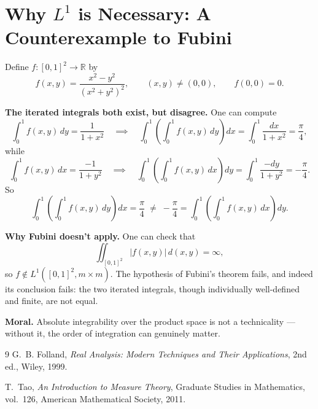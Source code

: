 \documentclass[11pt]{article}
\theoremstyle{definition}
\theoremstyle{plain}
\newcommand{\R}{\mathbb{R}}
\begin{document}
\section{Why \texorpdfstring{$L^{1}$}{L1} is Necessary: A Counterexample to Fubini}

Define $f : [0,1]^{2} \to \R$ by
\[
  f(x,y) = \frac{x^{2} - y^{2}}{(x^{2} + y^{2})^{2}},
  \qquad (x,y) \ne (0,0), \qquad f(0,0) = 0.
\]

\noindent
\textbf{The iterated integrals both exist, but disagree.} One can
compute
\[
  \int_0^1 f(x,y) \,dy = \frac{1}{1+x^{2}}
  \quad \implies \quad
  \int_0^1 \left( \int_0^1 f(x,y) \,dy \right) dx
    = \int_0^1 \frac{dx}{1+x^{2}} = \frac{\pi}{4},
\]
while
\[
  \int_0^1 f(x,y) \,dx = \frac{-1}{1+y^{2}}
  \quad \implies \quad
  \int_0^1 \left( \int_0^1 f(x,y) \,dx \right) dy
    = \int_0^1 \frac{-dy}{1+y^{2}} = -\frac{\pi}{4}.
\]
So
\[
  \int_0^1 \left( \int_0^1 f(x,y) \,dy \right) dx
    = \frac{\pi}{4}
    \;\ne\; -\frac{\pi}{4}
    = \int_0^1 \left( \int_0^1 f(x,y) \,dx \right) dy.
\]

\noindent
\textbf{Why Fubini doesn't apply.} One can check that
\[
  \iint_{[0,1]^{2}} |f(x,y)| \,d(x,y) = \infty,
\]
so $f \notin L^{1}([0,1]^{2}, m \times m)$. The hypothesis of Fubini's
theorem fails, and indeed its conclusion fails: the two iterated
integrals, though individually well-defined and finite, are not equal.

\medskip
\noindent
\textbf{Moral.} Absolute integrability over the product space is not a
technicality --- without it, the order of integration can genuinely
matter.

\begin{thebibliography}{9}
  G.~B. Folland,
  \emph{Real Analysis: Modern Techniques and Their Applications},
  2nd ed., Wiley, 1999.

  T.~Tao,
  \emph{An Introduction to Measure Theory},
  Graduate Studies in Mathematics, vol.~126,
  American Mathematical Society, 2011.
\end{thebibliography}
\end{document}
